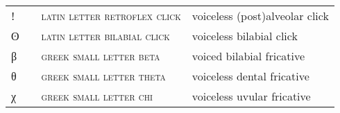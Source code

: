 \begin{center}
\begin{xtabular}{ l l L{4.5cm} L{4.5cm} }
ǃ &  & \textsc{latin letter retroflex click} & voiceless (post)alveolar click \\ 
ʘ &  & \textsc{latin letter bilabial click} & voiceless bilabial click \\ 
β &  & \textsc{greek small letter beta} & voiced bilabial fricative \\ 
θ &  & \textsc{greek small letter theta} & voiceless dental fricative \\ 
χ &  & \textsc{greek small letter chi} & voiceless uvular fricative \\
\end{xtabular}
\end{center}
